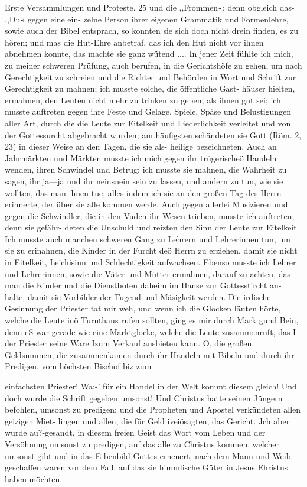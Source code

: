 Erste Versammlungen und Proteste. 25
und die ,,Frommen«; denn obgleich das- ,,Du« gegen eine ein-
zelne Person ihrer eigenen Grammatik und Formenlehre, sowie
auch der Bibel entsprach, so konnten sie sich doch nicht drein
finden, es zu hören; und mas die Hut-Ehre anbetraf, das ich
den Hut nicht vor ihnen abnehmen konnte, das machte sie ganz
wütend ....
In jener Zeit fühlte ich mich, zu meiner schweren Prüfung,
auch berufen, in die Gerichtshöfe zu gehen, um nach Gerechtigkeit
zu schreien und die Richter und Behörden in Wort und Schrift
zur Gerechtigkeit zu mahnen; ich musste solche, die öffentliche Gast-
häuser hielten, ermahnen, den Leuten nicht mehr zu trinken zu
geben, als ihnen gut sei; ich musste auftreten gegen ihre Feste
und Gelage, Spiele, Späse und Belustigungen aller Art, durch
die die Leute zur Eitelkeit und Liederlichkeit verleitet und von
der Gottessurcht abgebracht wurden; am häufigsten schändeten
sie Gott (Röm. 2, 23) in dieser Weise an den Tagen, die sie als-
heilige bezeichneten. Auch an Jahrmärkten und Märkten musste
ich mich gegen ihr trügerischeö Handeln wenden, ihren Schwindel
und Betrug; ich musste sie mahnen, die Wahrheit zu sagen, ihr
ja—ja und ihr neinsnein sein zu lassen, und andern zu tun, wie
sie wollten, das man ihnen tue, alles indem ich sie an den großen
Tag des Herrn  erinnerte, der über sie alle kommen werde. Auch
gegen allerlei Musizieren und gegen die Schwindler, die in den
Vuden ihr Wesen trieben, musste ich auftreten, denn sie gefähr-
deten die Unschuld und reizten den Sinn der Leute zur Eitelkeit.
Ich musste auch manchen schweren Gang zu Lehrern und Lehrerinnen
tun, um sie zu erinahnen, die Kinder in der Furcht deö Herrn zu
erziehen, damit sie nicht in Eitelkeit, Leichisinn und Schlechtigkeit
aufwachsen. Ebenso musste ich Lehrer und Lehrerinnen, sowie die
Väter und Mütter ermahnen, darauf zu achten, das man die
Kinder und die Dienstboten daheim im Hanse zur Gottesstircht an-
halte, damit sie Vorbilder der Tugend und Mäsigkeit werden.
Die irdische Gesinnung der Priester tat mir weh, und wenn
ich die Glocken läuten hörte, welche die Leute inö Turnthaus
rufen sollten, ging es mir durch Mark gund Bein, denn eS war
gerade wie eine Marktglocke, welche die Leute zusammenruft, das I
der Priester seine Ware Izum Verkauf ausbieteu kann. O, die
großen Geldsummen, die zusammenkamen durch ihr Handeln mit
Bibeln und durch ihr Predigen, vom höchsten Bischof biz zum


einfachsten Priester! Wa;-’ für ein Handel in der Welt kommt
diesem gleich! Und doch wurde die Schrift gegeben umsonst! Und
Christus hatte seinen Jüngern befohlen, umsonst zu predigen;
und die Propheten und Apostel verkündeten allen geizigen Miet-
lingen und allen, die für Geld iveiösagten, das Gericht. Jch
aber wurde au?-gesandt, in diesem freien Geist das Wort vom
Leben und der Versöhnung umsonst zu predigen, auf das alle zu
Christus kommen, welcher umsonst gibt und in das E-benbild
Gottes erneuert, nach dem Mann und Weib geschaffen waren
vor dem Fall, auf das sie himmlische Güter in Jesus Ehristus
haben möchten.